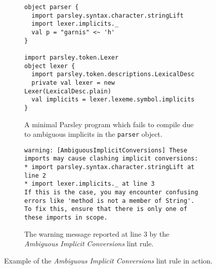 \documentclass[../../main.tex]{subfiles}
\begin{document}
\begin{figure}[!hb]
\begin{subfigure}{\textwidth}
\begin{verbatim}
object parser {
  import parsley.syntax.character.stringLift
  import lexer.implicits._
  val p = "garnis" <~ 'h'
}

import parsley.token.Lexer
object lexer {
  import parsley.token.descriptions.LexicalDesc
  private val lexer = new Lexer(LexicalDesc.plain)
  val implicits = lexer.lexeme.symbol.implicits
}
\end{verbatim}
\caption{A minimal Parsley program which fails to compile due to ambiguous implicits in the \texttt{parser} object.}
\label{fig:ambiguous-implicits-example}
\end{subfigure}
%
\begin{subfigure}{\textwidth}
\vspace{3ex}
\begin{verbatim}
warning: [AmbiguousImplicitConversions] These imports may cause clashing implicit conversions:
* import parsley.syntax.character.stringLift at line 2
* import lexer.implicits._ at line 3
If this is the case, you may encounter confusing errors like 'method is not a member of String'.
To fix this, ensure that there is only one of these imports in scope.
\end{verbatim}
\caption{The warning message reported at line 3 by the \emph{Ambiguous Implicit Conversions} lint rule.}
\label{fig:ambiguous-implicits-warning}
\end{subfigure}
\caption{Example of the \emph{Ambiguous Implicit Conversions} lint rule in action.}
\end{figure}
\end{document}
